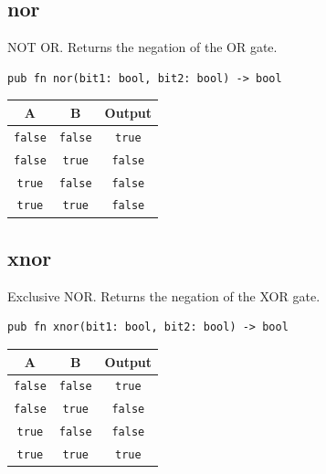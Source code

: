 \documentclass[a4paper,12pt]{report}
\begin{document}
\subsection*{nor}
NOT OR. Returns the negation of the OR gate.

\begin{lstlisting}
pub fn nor(bit1: bool, bit2: bool) -> bool
\end{lstlisting}

\begin{center}
\begin{tabular}{|c|c|c|}
\hline
\rowcolor{gray!20} \textbf{A} & \textbf{B} & \textbf{Output} \\ \hline
\texttt{false} & \texttt{false} & \texttt{true} \\ \hline
\texttt{false} & \texttt{true} & \texttt{false} \\ \hline
\texttt{true} & \texttt{false} & \texttt{false} \\ \hline
\texttt{true} & \texttt{true} & \texttt{false} \\ \hline
\end{tabular}
\end{center}

\subsection*{xnor}
Exclusive NOR. Returns the negation of the XOR gate.

\begin{lstlisting}
pub fn xnor(bit1: bool, bit2: bool) -> bool
\end{lstlisting}

\begin{center}
\begin{tabular}{|c|c|c|}
\hline
\rowcolor{gray!20} \textbf{A} & \textbf{B} & \textbf{Output} \\ \hline
\texttt{false} & \texttt{false} & \texttt{true} \\ \hline
\texttt{false} & \texttt{true} & \texttt{false} \\ \hline
\texttt{true} & \texttt{false} & \texttt{false} \\ \hline
\texttt{true} & \texttt{true} & \texttt{true} \\ \hline
\end{tabular}
\end{center}

\newpage

\end{document}
